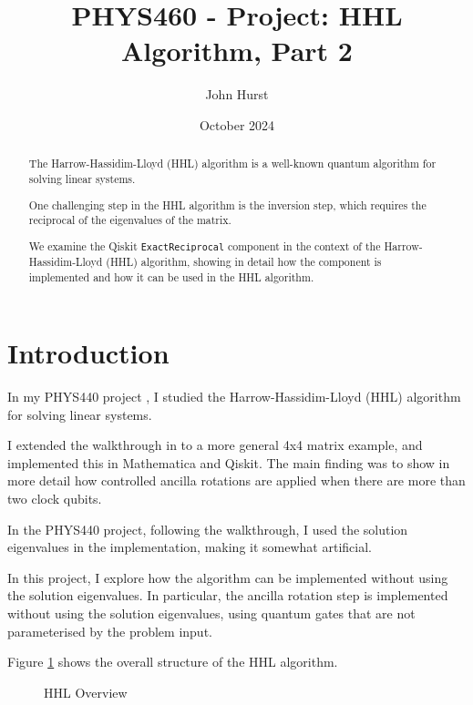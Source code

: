 \documentclass[12pt]{extarticle}
\title{PHYS460 - Project: HHL Algorithm, Part 2}
\author{John Hurst}
\date{October 2024}
\begin{document}
\maketitle

\tableofcontents

\begin{abstract}
The Harrow-Hassidim-Lloyd (HHL) algorithm\cite{hhl2009} is a well-known quantum algorithm for solving linear systems.

One challenging step in the HHL algorithm is the inversion step, which requires the reciprocal of the eigenvalues of the matrix.

We examine the Qiskit \texttt{ExactReciprocal}\cite{ibm_exact_reciprocal} component in the context of the Harrow-Hassidim-Lloyd (HHL) algorithm,
showing in detail how the component is implemented and how it can be used in the HHL algorithm.
\end{abstract}

\newpage

\section{Introduction}

In my PHYS440 project \cite{github_project_hhl}, I studied the Harrow-Hassidim-Lloyd (HHL) algorithm for solving linear systems.

I extended the walkthrough in \cite{zaman2023step} to a more general 4x4 matrix example, and implemented this in Mathematica and Qiskit.
The main finding was to show in more detail how controlled ancilla rotations are applied when there are more than two clock qubits.

In the PHYS440 project, following the walkthrough, I used the solution eigenvalues in the implementation,
making it somewhat artificial.

In this project, I explore how the algorithm can be implemented without using the solution eigenvalues.
In particular, the ancilla rotation step is implemented without using the solution eigenvalues,
using quantum gates that are not parameterised by the problem input.

Figure \ref{fig:hhloverview} shows the overall structure of the HHL algorithm.
\begin{figure}[h]
    \centering
    \caption{HHL Overview}
    \label{fig:hhloverview}
\end{figure}
\end{document}
